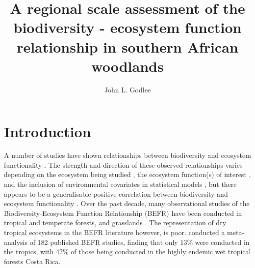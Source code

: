 \documentclass[11pt,a4paper]{article}
\title{A regional scale assessment of the biodiversity - ecosystem function relationship in southern African woodlands}
\author{John L. Godlee}
\date{}
\begin{document}
\maketitle
\tableofcontents

\section{Introduction}

A number of studies have shown relationships between biodiversity and ecosystem functionality \citep{Review}. The strength and direction of these observed relationships varies depending on the ecosystem being studied \citep{}, the ecosystem function(s) of interest \citep{}, and the inclusion of environmental covariates in statistical models \citep{}, but there appears to be a generalisable positive correlation between biodiversity and ecosystem functionality \citep{Liang2016}. Over the past decade, many observational studies of the Biodiversity-Ecosystem Function Relationship (BEFR) have been conducted in tropical and temperate forests, and grasslands \citep{Chen2011}. The representation of dry tropical ecosystems in the BEFR literature however, is poor. \citet{Clarke2017} conducted a meta-analysis of 182 published BEFR studies, finding that only 13\% were conducted in the tropics, with 42\% of those being conducted in the highly endemic wet tropical forests Costa Rica.
\end{document}
